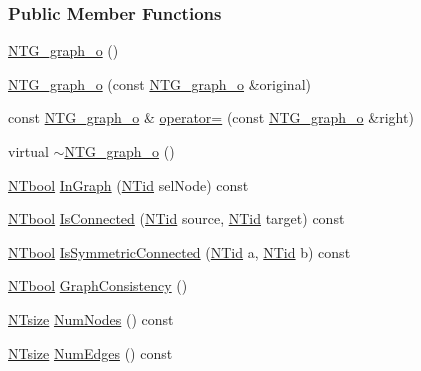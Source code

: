 \subsubsection*{Public Member Functions}
\begin{DoxyCompactItemize}
\item 
\hyperlink{class_n_t_g__graph__o_aa92663871cbcb4c2af3124ffcae7e63b}{NTG\_\-graph\_\-o} ()
\item 
\hyperlink{class_n_t_g__graph__o_a75e3516aad000710fa8b8d1d1c4b38fc}{NTG\_\-graph\_\-o} (const \hyperlink{class_n_t_g__graph__o}{NTG\_\-graph\_\-o} \&original)
\item 
const \hyperlink{class_n_t_g__graph__o}{NTG\_\-graph\_\-o} \& \hyperlink{class_n_t_g__graph__o_a4f3150e5c9061416e1adb7b230c9abbe}{operator=} (const \hyperlink{class_n_t_g__graph__o}{NTG\_\-graph\_\-o} \&right)
\item 
virtual \hyperlink{class_n_t_g__graph__o_af9cd385600ed82dac2a985ea28e7d34d}{$\sim$NTG\_\-graph\_\-o} ()
\item 
\hyperlink{nt__types_8h_a9f3200824a52174bb5be77bed3838822}{NTbool} \hyperlink{class_n_t_g__graph__o_a4a14ee0811504bf778cee67feff74490}{InGraph} (\hyperlink{nt__types_8h_ab5cab5f78fdd2211c340cbe527a4afd7}{NTid} selNode) const 
\item 
\hyperlink{nt__types_8h_a9f3200824a52174bb5be77bed3838822}{NTbool} \hyperlink{class_n_t_g__graph__o_a8fb06159c145601a4f7491e9773e9006}{IsConnected} (\hyperlink{nt__types_8h_ab5cab5f78fdd2211c340cbe527a4afd7}{NTid} source, \hyperlink{nt__types_8h_ab5cab5f78fdd2211c340cbe527a4afd7}{NTid} target) const 
\item 
\hyperlink{nt__types_8h_a9f3200824a52174bb5be77bed3838822}{NTbool} \hyperlink{class_n_t_g__graph__o_a11c9159530f0f4e6851b06c9cbf850fa}{IsSymmetricConnected} (\hyperlink{nt__types_8h_ab5cab5f78fdd2211c340cbe527a4afd7}{NTid} a, \hyperlink{nt__types_8h_ab5cab5f78fdd2211c340cbe527a4afd7}{NTid} b) const 
\item 
\hyperlink{nt__types_8h_a9f3200824a52174bb5be77bed3838822}{NTbool} \hyperlink{class_n_t_g__graph__o_a57f186e561d6f92b0ec359639e4e5eb3}{GraphConsistency} ()
\item 
\hyperlink{nt__types_8h_a06c124f2e4469769b58230253ce0560b}{NTsize} \hyperlink{class_n_t_g__graph__o_accb8a24c46d3613ab6ed09ecd8e0f449}{NumNodes} () const 
\item 
\hyperlink{nt__types_8h_a06c124f2e4469769b58230253ce0560b}{NTsize} \hyperlink{class_n_t_g__graph__o_a7b436e14a4ff1415d549e80ce0e272cd}{NumEdges} () const 
\item 

\end{DoxyCompactItemize}
